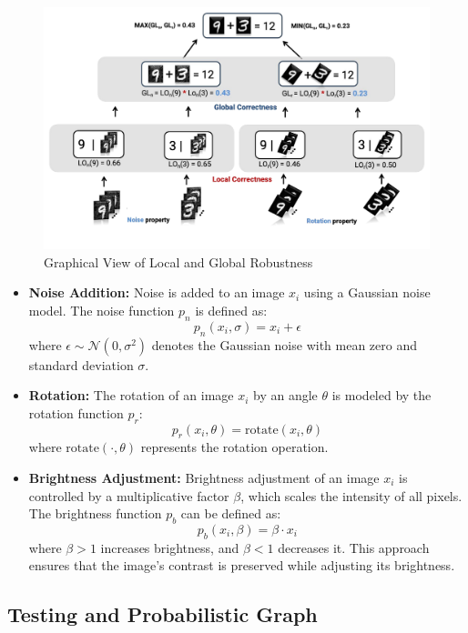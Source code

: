 \documentclass[10pt, conference, a4paper, final]{IEEEtran}
\begin{document}
\begin{figure}{}
    \centering
    \includegraphics[width=\linewidth]{paper_images/noise_rotation_localcal_global.pdf}
    \caption{Graphical View of Local and Global Robustness}
    \label{fig:graph}
\end{figure}
\begin{itemize}
    \item \textbf{Noise Addition:} Noise is added to an image \( x_i \) using a Gaussian noise model. The noise function \( p_n \) is defined as:
    \[ p_n(x_i, \sigma) = x_i + \epsilon \]
    where \( \epsilon \sim \mathcal{N}(0, \sigma^2) \) denotes the Gaussian noise with mean zero and standard deviation \(\sigma\).

    \item \textbf{Rotation:} The rotation of an image \( x_i \) by an angle \(\theta\) is modeled by the rotation function \( p_r \):
    \[ p_r(x_i, \theta) = \text{rotate}(x_i, \theta) \]
    where \(\text{rotate}(\cdot, \theta)\) represents the rotation operation.

    \item \textbf{Brightness Adjustment:} Brightness adjustment of an image \( x_i \) is controlled by a multiplicative factor \( \beta \), which scales the intensity of all pixels. The brightness function \( p_b \) can be defined as:
    \[ p_b(x_i, \beta) = \beta \cdot x_i \]
    where \( \beta > 1 \) increases brightness, and \( \beta < 1 \) decreases it. This approach ensures that the image's contrast is preserved while adjusting its brightness.

\end{itemize}

\subsection{Testing and Probabilistic Graph}
\end{document}
